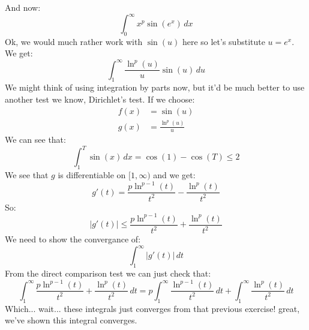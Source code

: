 \documentclass{article}
\theoremstyle{plain}
\begin{document}
	\newpage
	
	And now:
	\[
		\int_{0}^{\infty}{x^p\sin(e^x)\,dx}
	\]
	Ok, we would much rather work with $\sin(u)$ here so let's substitute
	$u = e^x$. We get:
	\[
		\int_{1}^{\infty}{\frac{\ln^p(u)}{u}\sin(u)\,du}
	\]
	We might think of using integration by parts now, but it'd be much better
	to use another test we know, Dirichlet's test. If we choose:
	\begin{align*}
		f(x) &= \sin(u) \\
		g(x) &= \frac{\ln^p(u)}{u}
	\end{align*}
	We can see that:
	\[
		\int_{1}^{T}{\sin(x)\,dx} = \cos(1) - \cos(T) \le 2
	\]
	We see that $g$ is differentiable on $[1,\infty)$ and we get:
	\[
		g'(t) = 
		\dfrac{p\ln^{p-1}\left(t\right)}{t^2}-\dfrac{\ln^p\left(t\right)}{t^2}
	\]
	So:
	\[
		|g'(t)| \le 
		\dfrac{p\ln^{p-1}\left(t\right)}{t^2}+\dfrac{\ln^p\left(t\right)}{t^2}
	\]
	We need to show the convergance of:
	\[
		\int_{1}^{\infty}{|g'(t)|\,dt}
	\]
	From the direct comparison test we can just check that:
	\[
		\int_{1}^{\infty}
		{\dfrac{p\ln^{p-1}\left(t\right)}{t^2}+
		\dfrac{\ln^p\left(t\right)}{t^2}\,dt} = 
		p\int_{1}^{\infty}{\dfrac{\ln^{p-1}\left(t\right)}{t^2}\,dt} + 
		\int_{1}^{\infty}{\dfrac{\ln^p\left(t\right)}{t^2}\,dt}
	\]
	Which... wait... these integrals just converges from that previous 
	exercise! great, we've shown this integral converges.
	
	\newpage
	
\end{document}
